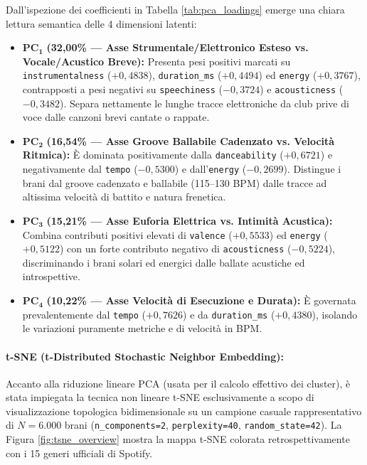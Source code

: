 \documentclass[12pt,a4paper]{article}
\begin{document}
Dall'ispezione dei coefficienti in Tabella \ref{tab:pca_loadings} emerge una chiara lettura semantica delle 4 dimensioni latenti:
\begin{itemize}
    \item $\mathbf{PC_1}$ \textbf{(32,00\% — Asse Strumentale/Elettronico Esteso vs. Vocale/Acustico Breve):} Presenta pesi positivi marcati su \texttt{instrumentalness} ($+0,4838$), \texttt{duration\_ms} ($+0,4494$) ed \texttt{energy} ($+0,3767$), contrapposti a pesi negativi su \texttt{speechiness} ($-0,3724$) e \texttt{acousticness} ($-0,3482$). Separa nettamente le lunghe tracce elettroniche da club prive di voce dalle canzoni brevi cantate o rappate.
    \item $\mathbf{PC_2}$ \textbf{(16,54\% — Asse Groove Ballabile Cadenzato vs. Velocità Ritmica):} È dominata positivamente dalla \texttt{danceability} ($+0,6721$) e negativamente dal \texttt{tempo} ($-0,5300$) e dall'\texttt{energy} ($-0,2699$). Distingue i brani dal groove cadenzato e ballabile (115--130 BPM) dalle tracce ad altissima velocità di battito e natura frenetica.
    \item $\mathbf{PC_3}$ \textbf{(15,21\% — Asse Euforia Elettrica vs. Intimità Acustica):} Combina contributi positivi elevati di \texttt{valence} ($+0,5533$) ed \texttt{energy} ($+0,5122$) con un forte contributo negativo di \texttt{acousticness} ($-0,5224$), discriminando i brani solari ed energici dalle ballate acustiche ed introspettive.
    \item $\mathbf{PC_4}$ \textbf{(10,22\% — Asse Velocità di Esecuzione e Durata):} È governata prevalentemente dal \texttt{tempo} ($+0,7626$) e da \texttt{duration\_ms} ($+0,4380$), isolando le variazioni puramente metriche e di velocità in BPM.
\end{itemize}

\newpage
\paragraph{t-SNE (t-Distributed Stochastic Neighbor Embedding):}
Accanto alla riduzione lineare PCA (usata per il calcolo effettivo dei cluster), è stata impiegata la tecnica non lineare t-SNE esclusivamente a scopo di visualizzazione topologica bidimensionale su un campione casuale rappresentativo di $N = 6.000$ brani (\texttt{n\_components=2}, \texttt{perplexity=40}, \texttt{random\_state=42}). La Figura \ref{fig:tsne_overview} mostra la mappa t-SNE colorata retrospettivamente con i 15 generi ufficiali di Spotify.
\end{document}
